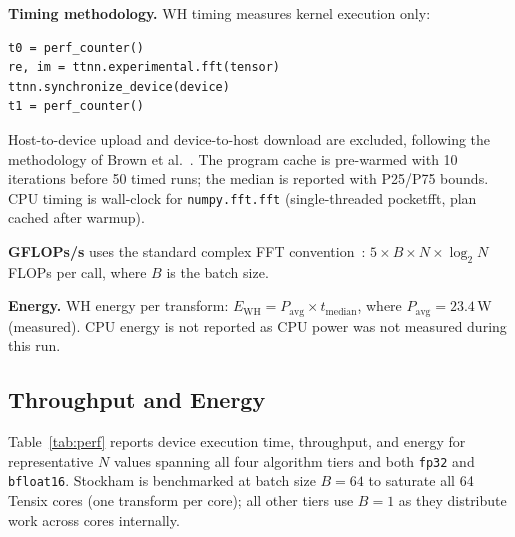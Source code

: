 \documentclass[conference]{IEEEtran}
\begin{document}
\textbf{Timing methodology.}
WH timing measures kernel execution only:
\begin{lstlisting}
t0 = perf_counter()
re, im = ttnn.experimental.fft(tensor)
ttnn.synchronize_device(device)
t1 = perf_counter()
\end{lstlisting}
Host-to-device upload and device-to-host download are excluded, following the
methodology of Brown et al.~\cite{brown2025}. The program cache is pre-warmed
with 10 iterations before 50 timed runs; the median is reported with P25/P75
bounds. CPU timing is wall-clock for \texttt{numpy.fft.fft} (single-threaded
pocketfft, plan cached after warmup).

\textbf{GFLOPs/s} uses the standard complex FFT convention~\cite{cufft}:
$5 \times B \times N \times \log_2 N$ FLOPs per call,
where $B$ is the batch size.

\textbf{Energy.}
WH energy per transform: $E_{\mathrm{WH}} = P_{\mathrm{avg}} \times t_{\mathrm{median}}$,
where $P_{\mathrm{avg}} = 23.4$\,W (measured). CPU energy is not reported as
CPU power was not measured during this run.

\subsection{Throughput and Energy}

Table~\ref{tab:perf} reports device execution time, throughput, and energy
for representative $N$ values spanning all four algorithm tiers and both
\texttt{fp32} and \texttt{bfloat16}. Stockham is benchmarked at batch size
$B = 64$ to saturate all 64 Tensix cores (one transform per core); all other
tiers use $B = 1$ as they distribute work across cores internally.
\end{document}
